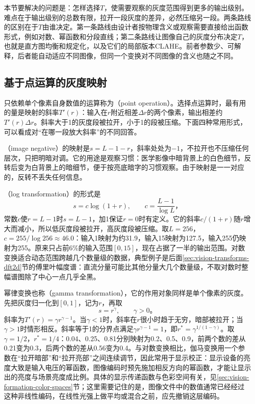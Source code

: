 本节要解决的问题是：怎样选择$T$，使需要观察的灰度范围得到更多的输出级别。难点在于输出级别的总数有限，拉开一段灰度的差异，必然压缩另一段。两条路线的区别在于$T$由谁决定。第一条路线由设计者按物理含义或观察需要直接给出函数形式，例如对数、幂函数和分段直线；第二条路线让图像自己的灰度分布决定$T$，也就是直方图均衡和规定化，以及它们的局部版本CLAHE。前者参数少、可解释，后者能自动适应不同图像，但同一个变换对不同图像的含义也随之不同。

\subsection{基于点运算的灰度映射}
\label{sec:vision-transforms-point-operations}

只依赖单个像素自身数值的运算称为（point operation）。选择点运算时，最有用的量是映射的斜率$T'(r)$：输入在$r$附近相差$\Delta r$的两个像素，输出相差约$T'(r)\Delta r$。斜率大于1的灰度段被拉开，小于1的段被压缩。下面四种常用形式，可以看成对“在哪一段放大斜率”的不同回答。

（image negative）的映射是$s=L-1-r$，斜率处处为$-1$，不拉开也不压缩任何层次，只把明暗对调。它的用途是观察习惯：医学影像中暗背景上的白色细节，反转后变为白背景上的暗细节，便于按亮底暗字的习惯观察。由于映射是一一对应的，反转不丢失任何信息。

（log transformation）的形式是
\begin{equation}
  s=c\log(1+r),\qquad c=\frac{L-1}{\log L}\text{，}
  \label{eq:vision-transforms-log}
\end{equation}
常数$c$使$r=L-1$时$s=L-1$，加1保证$r=0$时有定义。它的斜率$c/(1+r)$随$r$增大而减小，所以低灰度段被拉开，高灰度段被压缩。取$L=256$，$c=255/\log256\approx46.0$：输入1映射为约31.9，输入15映射为127.5，输入255仍映射为255。原来只占前6\%的输入范围$[0,15]$，现在占据了一半的输出范围。对数变换适合动态范围跨越几个数量级的数据，典型例子是后面\ref{sec:vision-transforms-dft2d}节的傅里叶幅度谱：直流分量可能比其他分量大几个数量级，不取对数时整幅谱图除了中心一点几乎全黑。

幂律变换也称（gamma transformation），它的作用对象同样是单个像素的灰度。先把灰度归一化到$[0,1]$，记为$r$，再取
\begin{equation}
  s=r^{\gamma},\qquad \gamma>0\text{。}
  \label{eq:vision-transforms-gamma}
\end{equation}
斜率为$T'(r)=\gamma r^{\gamma-1}$。当$\gamma<1$时，斜率在$r$很小时趋于无穷，暗部被拉开；当$\gamma>1$时情形相反。斜率等于1的分界点满足$\gamma r^{\gamma-1}=1$，即$r^{*}=\gamma^{1/(1-\gamma)}$。取$\gamma=1/2$，$r^{*}=1/4$：0.04、0.25、0.81分别映射为0.2、0.5、0.9，前两个数的差从0.21变为0.3，后两个数的差从0.56变为0.4。与对数变换相比，伽马变换用一个参数在“拉开暗部”和“拉开亮部”之间连续调节，因此常用于显示校正：显示设备的亮度大致是输入电压的幂函数，图像编码时预先施加相反方向的幂函数，才能让显示出的亮度与场景亮度成比例。具体的显示传递函数与色彩空间有关，见\ref{sec:vision-formation-color-spaces}节；这里需要记住的是，图像文件中的数值通常已经经过这种非线性编码，在线性光强上做平均或混合之前，应先撤销这层编码。

